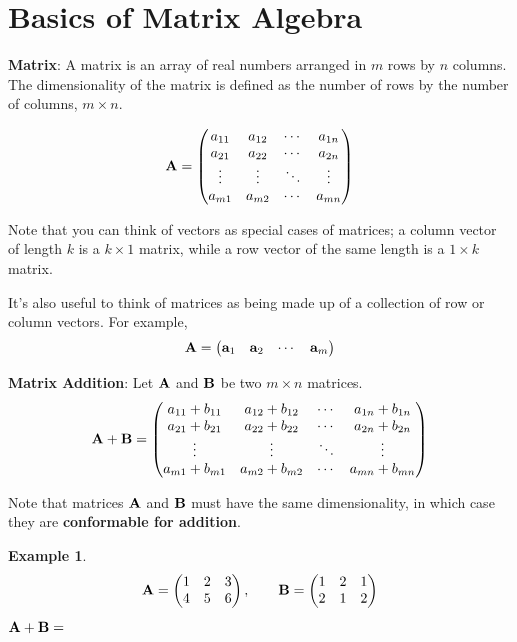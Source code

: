 \documentclass[
]{book}
\theoremstyle{definition}
\theoremstyle{definition}
\newtheorem{example}{Example}[chapter]
\theoremstyle{definition}
\theoremstyle{definition}
\theoremstyle{remark}
\begin{document}
\hypertarget{matrixbasics}{%
\section{Basics of Matrix Algebra}\label{matrixbasics}}

\textbf{Matrix}: A matrix is an array of real numbers arranged in \(m\) rows by \(n\) columns. The dimensionality of the matrix is defined as the number of rows by the number of columns, \(m \times n\).

\[{\bf A}=\begin{pmatrix}
            a_{11} & a_{12} & \cdots & a_{1n} \\
            a_{21} & a_{22} & \cdots & a_{2n} \\
            \vdots & \vdots & \ddots & \vdots \\
            a_{m1} & a_{m2} & \cdots & a_{mn}
        \end{pmatrix}\]

Note that you can think of vectors as special cases of matrices; a column vector of length \(k\) is a \(k \times 1\) matrix, while a row vector of the same length is a \(1 \times k\) matrix.

It's also useful to think of matrices as being made up of a collection of row or column vectors. For example,
\[\bf A = \begin{pmatrix} {\bf a}_1 & {\bf a}_2 &  \cdots & {\bf a}_m \end{pmatrix}\]

\textbf{Matrix Addition}: Let \(\bf A\) and \(\bf B\) be two \(m\times n\) matrices.
\[{\bf A+B}=\begin{pmatrix}
            a_{11}+b_{11} & a_{12}+b_{12} & \cdots & a_{1n}+b_{1n} \\
            a_{21}+b_{21} & a_{22}+b_{22} & \cdots & a_{2n}+b_{2n} \\
            \vdots & \vdots  & \ddots & \vdots \\
            a_{m1}+b_{m1} & a_{m2}+b_{m2} & \cdots & a_{mn}+b_{mn}
        \end{pmatrix}\]

Note that matrices \({\bf A}\) and \({\bf B}\) must have the same dimensionality, in which case they are \textbf{conformable for addition}.

\begin{example}
\protect\hypertarget{exm:matrixaddition}{}{\label{exm:matrixaddition} }\[{\bf A}=\begin{pmatrix} 1 & 2 & 3 \\ 4 & 5 & 6 \end{pmatrix}, \qquad
            {\bf B}=\begin{pmatrix} 1 & 2 & 1 \\ 2 & 1 & 2 \end{pmatrix}\]
\({\bf A+B}=\)
\end{example}
\end{document}
